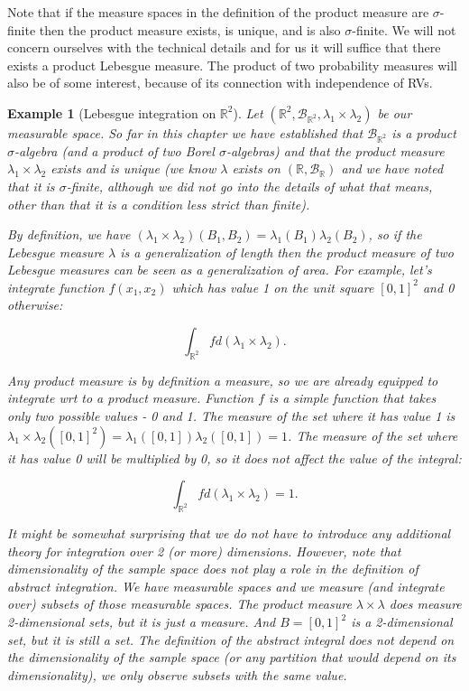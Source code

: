 \documentclass{book}
\theoremstyle{plain}%
\newtheorem{prototheorem}{Example}[section]
\newenvironment{cexample}
   {\colorlet{shadecolor}{gray!10}\begin{shaded}\begin{prototheorem}}
   {\end{prototheorem}\end{shaded}}
\theoremstyle{definition}
\begin{document}
Note that if the measure spaces in the definition of the product measure are $\sigma$-finite then the product measure exists, is unique, and is also $\sigma$-finite. We will not concern ourselves with the technical details and for us it will suffice that there exists a product Lebesgue measure. The product of two probability measures will also be of some interest, because of its connection with independence of RVs.

\begin{cexample}[Lebesgue integration on $\mathbb{R}^2$] Let $(\mathbb{R}^2, \mathcal{B}_{\mathbb{R}^2}, \lambda_1 \times \lambda_2)$ be our measurable space. So far in this chapter we have established that $\mathcal{B}_{\mathbb{R}^2}$ is a product $\sigma$-algebra (and a product of two Borel $\sigma$-algebras) and that the product measure $\lambda_1 \times \lambda_2$ exists and is unique (we know $\lambda$ exists on $(\mathbb{R}, \mathcal{B}_{\mathbb{R}})$ and we have noted that it is $\sigma$-finite, although we did not go into the details of what that means, other than that it is a condition less strict than finite).

By definition, we have $(\lambda_1 \times \lambda_2)(B_1, B_2) = \lambda_1(B_1)\lambda_2(B_2)$, so if the Lebesgue measure $\lambda$ is a generalization of length then the product measure of two Lebesgue measures can be seen as a generalization of area. For example, let's integrate function $f(x_1, x_2)$ which has value 1 on the unit square $[0, 1]^2$ and 0 otherwise:

$$\int_{\mathbb{R}^2} f d(\lambda_1 \times \lambda_2).$$

Any product measure is by definition a measure, so we are already equipped to integrate wrt to a product measure. Function $f$ is a simple function that takes only two possible values - 0 and 1. The measure of the set where it has value 1 is $\lambda_1 \times \lambda_2([0, 1]^2) = \lambda_1([0, 1]) \lambda_2([0, 1])= 1$. The measure of the set where it has value 0 will be multiplied by 0, so it does not affect the value of the integral:

$$\int_{\mathbb{R}^2} f d(\lambda_1 \times \lambda_2) = 1.$$

It might be somewhat surprising that we do not have to introduce any additional theory for integration over 2 (or more) dimensions. However, note that dimensionality of the sample space does not play a role in the definition of abstract integration. We have measurable spaces and we measure (and integrate over) subsets of those measurable spaces. The product measure $\lambda \times \lambda$ does measure 2-dimensional sets, but it is just a measure. And $B = [0, 1]^2$ is a 2-dimensional set, but it is still a set. The definition of the abstract integral does not depend on the dimensionality of the sample space (or any partition that would depend on its dimensionality), we only observe subsets with the same value.
\end{cexample}
\end{document}

